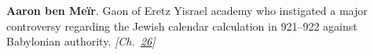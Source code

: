 \textbf{Aaron ben Meïr}. Gaon of Eretz Yisrael academy who instigated a major controversy regarding the Jewish calendar calculation in 921–922 against Babylonian authority. \emph{[Ch.~\hyperref[ch:jewishcalendar]{26}]}


